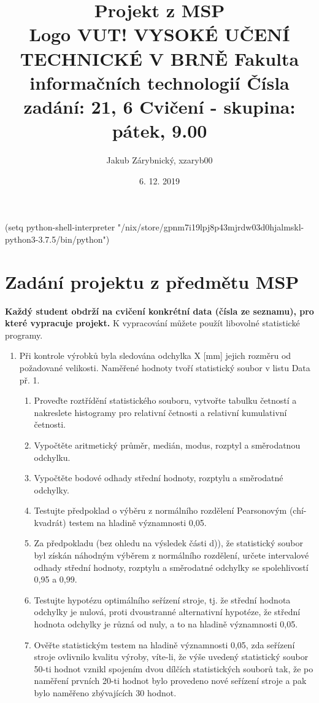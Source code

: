 \documentclass[11pt,titlepage]{article}
\author{Jakub Zárybnický, xzaryb00}
\date{6. 12. 2019}
\title{Projekt z MSP\\\medskip
\large Logo VUT! VYSOKÉ UČENÍ TECHNICKÉ V BRNĚ Fakulta informačních technologií Čísla zadání: 21, 6 Cvičení - skupina: pátek, 9.00}
\begin{document}
\maketitle
(setq python-shell-interpreter "/nix/store/gpnm7i19lpj8p43mjrdw03d0hjalmskl-python3-3.7.5/bin/python")

\section{Zadání projektu z předmětu MSP}
\label{sec:org6c1c812}
\textbf{Každý student obdrží na cvičení konkrétní data (čísla ze seznamu), pro které vypracuje projekt.}
K vypracování můžete použít libovolné statistické programy.

\begin{enumerate}
\item Při kontrole výrobků byla sledována odchylka X [mm] jejich rozměru od
požadované velikosti. Naměřené hodnoty tvoří statistický soubor v listu
Data př. 1.

\begin{enumerate}
\item Proveďte roztřídění statistického souboru, vytvořte tabulku četností a
nakreslete histogramy pro relativní četnosti a relativní kumulativní
četnosti.
\item Vypočtěte aritmetický průměr, medián, modus, rozptyl a směrodatnou
odchylku.
\item Vypočtěte bodové odhady střední hodnoty, rozptylu a směrodatné odchylky.
\item Testujte předpoklad o výběru z normálního rozdělení Pearsonovým
(chí-kvadrát) testem na hladině významnosti 0,05.
\item Za předpokladu (bez ohledu na výsledek části d)), že statistický soubor
byl získán náhodným výběrem z normálního rozdělení, určete intervalové
odhady střední hodnoty, rozptylu a směrodatné odchylky se spolehlivostí
0,95 a 0,99.
\item Testujte hypotézu optimálního seřízení stroje, tj. že střední hodnota
odchylky je nulová, proti dvoustranné alternativní hypotéze, že střední
hodnota odchylky je různá od nuly, a to na hladině významnosti 0,05.
\item Ověřte statistickým testem na hladině významnosti 0,05, zda seřízení
stroje ovlivnilo kvalitu výroby, víte-li, že výše uvedený statistický
soubor 50-ti hodnot vznikl spojením dvou dílčích statistických souborů
tak, že po naměření prvních 20-ti hodnot bylo provedeno nové seřízení
stroje a pak bylo naměřeno zbývajících 30 hodnot.
\end{enumerate}


\end{enumerate}
\end{document}
